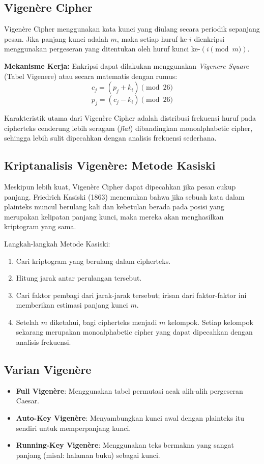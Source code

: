 \documentclass[../main.tex]{subfiles}
\begin{document}
\subsection{Vigen\`ere Cipher}
Vigen\`ere Cipher menggunakan kata kunci yang diulang secara periodik sepanjang pesan. Jika panjang kunci adalah $m$, maka setiap huruf ke-$i$ dienkripsi menggunakan pergeseran yang ditentukan oleh huruf kunci ke-$(i \pmod m)$.

\textbf{Mekanisme Kerja:}
Enkripsi dapat dilakukan menggunakan \textit{Vigenere Square} (Tabel Vigenere) atau secara matematis dengan rumus:
\[ c_j = (p_j + k_i) \pmod{26} \]
\[ p_j = (c_j - k_i) \pmod{26} \]

Karakteristik utama dari Vigen\`ere Cipher adalah distribusi frekuensi huruf pada cipherteks cenderung lebih seragam (\textit{flat}) dibandingkan monoalphabetic cipher, sehingga lebih sulit dipecahkan dengan analisis frekuensi sederhana.

\subsection{Kriptanalisis Vigen\`ere: Metode Kasiski}
Meskipun lebih kuat, Vigen\`ere Cipher dapat dipecahkan jika pesan cukup panjang. Friedrich Kasiski (1863) menemukan bahwa jika sebuah kata dalam plainteks muncul berulang kali dan kebetulan berada pada posisi yang merupakan kelipatan panjang kunci, maka mereka akan menghasilkan kriptogram yang sama.

Langkah-langkah Metode Kasiski:
\begin{enumerate}
    \item Cari kriptogram yang berulang dalam cipherteks.
    \item Hitung jarak antar perulangan tersebut.
    \item Cari faktor pembagi dari jarak-jarak tersebut; irisan dari faktor-faktor ini memberikan estimasi panjang kunci $m$.
    \item Setelah $m$ diketahui, bagi cipherteks menjadi $m$ kelompok. Setiap kelompok sekarang merupakan monoalphabetic cipher yang dapat dipecahkan dengan analisis frekuensi.
\end{enumerate}

\subsection{Varian Vigen\`ere}
\begin{itemize}
    \item \textbf{Full Vigen\`ere}: Menggunakan tabel permutasi acak alih-alih pergeseran Caesar.
    \item \textbf{Auto-Key Vigen\`ere}: Menyambungkan kunci awal dengan plainteks itu sendiri untuk memperpanjang kunci.
    \item \textbf{Running-Key Vigen\`ere}: Menggunakan teks bermakna yang sangat panjang (misal: halaman buku) sebagai kunci.
\end{itemize}
\end{document}
